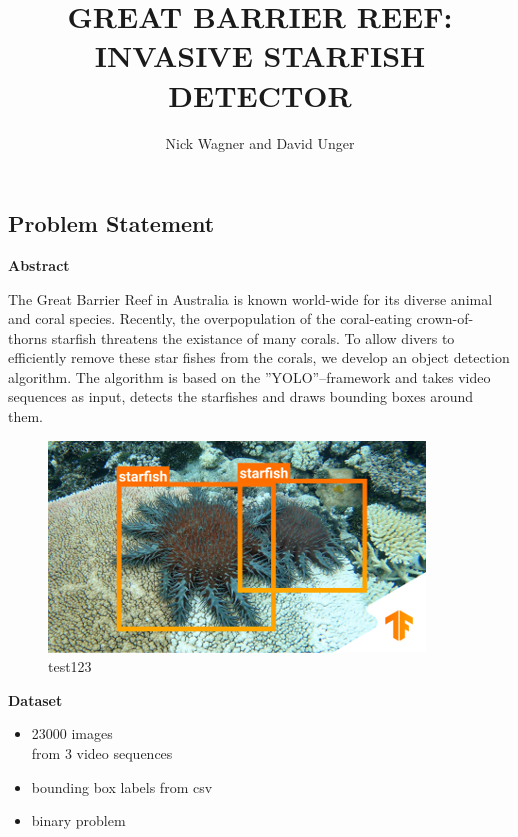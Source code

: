 \documentclass[landscape,a2,final,10pt]{issposter}
\title{\MakeUppercase{Great Barrier Reef: Invasive Starfish Detector}}
\author{Nick Wagner and David Unger}
\institute{Institute of Signal Processing and System Theory, University of Stuttgart, Germany}
\begin{document}
\maketitle

\raggedright

\begin{multicols}{3}
\section{Problem Statement}
    \textbf{Abstract}\\
    \begin{small} The Great Barrier Reef in Australia is known world-wide for its diverse animal and coral species.
        Recently, the overpopulation of the coral-eating crown-of-thorns starfish threatens the existance of many corals.
        To allow divers to efficiently remove these star fishes from the corals, we develop an object detection algorithm. \newline
        The algorithm is based on the ''YOLO''--framework and takes video sequences as input, detects the starfishes and draws bounding boxes around them.
    \bigskip   
    \end{small}
    \begin{figure}
    \includegraphics[scale=0.8]{1_starfishes.png}
    \caption{test123}
    \end{figure} 

    \textbf{Dataset}
    \begin{small}
    \begin{itemize}
        \item \raisebox{-0.6ex}{\~{}}23000 images\\ from 3 video sequences
        \item bounding box labels from csv\\
        \item binary problem
    \end{itemize}
    \end{small}
    \hfill \break
    \hfill \break
    \columnbreak

\end{multicols}
\end{document}
